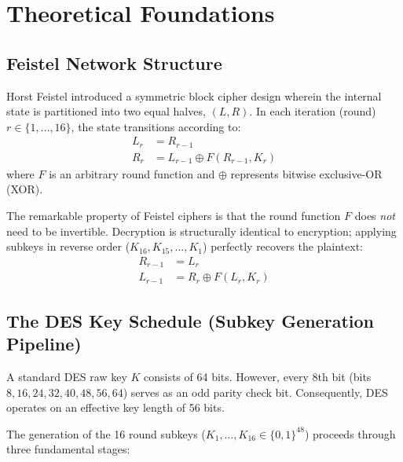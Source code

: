 \documentclass[12pt,a4paper]{article}
\begin{document}
\section{Theoretical Foundations}

\subsection{Feistel Network Structure}
Horst Feistel introduced a symmetric block cipher design wherein the internal state is partitioned into two equal halves, $(L, R)$. In each iteration (round) $r \in \{1, \dots, 16\}$, the state transitions according to:
\begin{align}
    L_r &= R_{r-1} \\
    R_r &= L_{r-1} \oplus F(R_{r-1}, K_r)
\end{align}
where $F$ is an arbitrary round function and $\oplus$ represents bitwise exclusive-OR (XOR). 

The remarkable property of Feistel ciphers is that the round function $F$ does \textit{not} need to be invertible. Decryption is structurally identical to encryption; applying subkeys in reverse order ($K_{16}, K_{15}, \dots, K_1$) perfectly recovers the plaintext:
\begin{align}
    R_{r-1} &= L_r \\
    L_{r-1} &= R_r \oplus F(L_r, K_r)
\end{align}

\subsection{The DES Key Schedule (Subkey Generation Pipeline)}
A standard DES raw key $K$ consists of 64 bits. However, every 8th bit (bits $8, 16, 24, 32, 40, 48, 56, 64$) serves as an odd parity check bit. Consequently, DES operates on an effective key length of 56 bits.

The generation of the 16 round subkeys ($K_1, \dots, K_{16} \in \{0, 1\}^{48}$) proceeds through three fundamental stages:

\begin{figure}[h!]
    \centering
    \begin{tikzpicture}
    \end{tikzpicture}
\end{figure}
\end{document}
